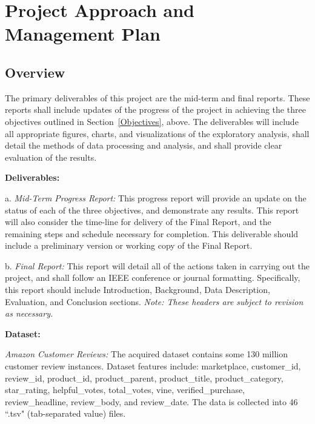 \documentclass[12pt]{article}
\begin{document}
\section{Project Approach and Management Plan}

	\subsection{Overview}\hspace{4ex}The primary deliverables of this project are the mid-term and final reports. These reports shall include updates of the progress of the project in achieving the three objectives outlined in Section~\ref{Objectives}, above. The deliverables will include all appropriate figures, charts, and visualizations of the exploratory analysis, shall detail the methods of data processing and analysis, and shall provide clear evaluation of the results.
	
	\vspace{-7mm}
	\begin{flushleft}
		\item{\textbf{Deliverables:}}
		
		\hspace{4ex} a. \textit{Mid-Term Progress Report:} This progress report will provide an update on the status of each of the three objectives, and demonstrate any results. This report will also consider the time-line for delivery of the Final Report, and the remaining steps and schedule necessary for completion. This deliverable should include a preliminary version or working copy of the Final Report.
		
		\hspace{4ex} b. \textit{Final Report:} This report will detail all of the actions taken in carrying out the project, and shall follow an IEEE conference or journal formatting. Specifically, this report should include Introduction, Background, Data Description, Evaluation, and Conclusion sections. \textit{Note: These headers are subject to revision as necessary.} \\[11pt]
		
		\item{\textbf{Dataset:}}
		
		\hspace{4ex} \textit{Amazon Customer Reviews:} The acquired dataset contains some 130 million customer review instances. Dataset features include: marketplace, customer\_id, review\_id, product\_id, product\_parent, product\_title, product\_category, star\_rating, helpful\_votes, total\_votes, vine, verified\_purchase, review\_headline, review\_body, and review\_date. The data is collected into 46 ``.tsv" (tab-separated value) files. 
				
	\end{flushleft} 
	
\end{document}

